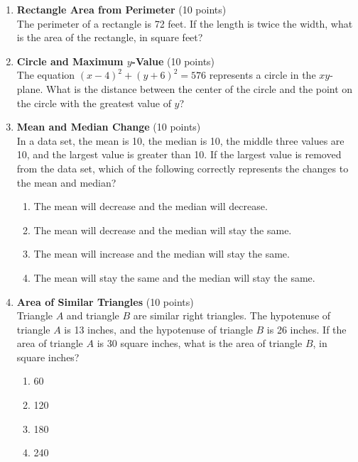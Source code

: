 \begin{enumerate}
  \item \textbf{Rectangle Area from Perimeter} (10 points)\\
  The perimeter of a rectangle is 72 feet. If the length is twice the width, what is the area of the rectangle, in square feet?
  \begin{subanswer}
  \end{subanswer}

  

  \item \textbf{Circle and Maximum $y$-Value} (10 points)\\
  The equation $(x-4)^2 + (y+6)^2 = 576$ represents a circle in the $xy$-plane. What is the distance between the center of the circle and the point on the circle with the greatest value of $y$?
  \begin{subanswer}
  \end{subanswer}


  

  \item \textbf{Mean and Median Change} (10 points)\\
  In a data set, the mean is 10, the median is 10, the middle three values are 10, and the largest value is greater than 10. If the largest value is removed from the data set, which of the following correctly represents the changes to the mean and median?
  \begin{enumerate}[label=(\Alph*)]
    \item The mean will decrease and the median will decrease.
    \item The mean will decrease and the median will stay the same.
    \item The mean will increase and the median will stay the same.
    \item The mean will stay the same and the median will stay the same.
  \end{enumerate}
  \begin{subanswer}
  \end{subanswer}


  

  \item \textbf{Area of Similar Triangles} (10 points)\\
  Triangle $A$ and triangle $B$ are similar right triangles. The hypotenuse of triangle $A$ is 13 inches, and the hypotenuse of triangle $B$ is 26 inches. If the area of triangle $A$ is 30 square inches, what is the area of triangle $B$, in square inches?
  \begin{enumerate}[label=(\Alph*)]
    \item 60
    \item 120
    \item 180
    \item 240
  \end{enumerate}
  \begin{subanswer}
  \end{subanswer}



\end{enumerate}
